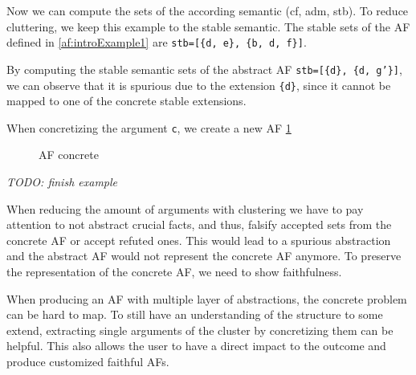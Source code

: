 Now we can compute the sets of the according semantic (\ac{cf}, \ac{adm}, \ac{stb}). To reduce cluttering, we keep this example to the stable semantic. The stable sets of the \ac{AF} defined in \ref{af:introExample1} are \texttt{stb=[\{d, e\}, \{b, d, f\}]}.

By computing the stable semantic sets of the abstract \ac{AF} \texttt{stb=[\{d\}, \{d, g'\}]}, we can observe that it is spurious due to the extension \texttt{\{d\}}, since it cannot be mapped to one of the concrete stable extensions. 

When concretizing the argument \texttt{c}, we create a new \ac{AF} \ref{af:introExample3}

\begin{figure}[h]
    \centering
    \caption{\ac{AF} concrete}
    \label{af:introExample3}
\end{figure}

\textit{TODO: finish example}
\vspace{1cm}


When reducing the amount of arguments with clustering we have to pay attention to not abstract crucial facts, and thus, falsify accepted sets from the concrete \ac{AF} or accept refuted ones. This would lead to a spurious abstraction and the abstract \ac{AF} would not represent the concrete \ac{AF} anymore. To preserve the representation of the concrete \ac{AF}, we need to show faithfulness.

When producing an \ac{AF} with multiple layer of abstractions, the concrete problem can be hard to map. To still have an understanding of the structure to some extend, extracting single arguments of the cluster by concretizing them can be helpful. This also allows the user to have a direct impact to the outcome and produce customized faithful \acp{AF}.  


